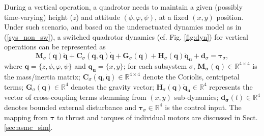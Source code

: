 During a vertical operation, a quadrotor needs to maintain a given (possibly time-varying) height ($z$) and attitude $(\phi, \varphi, \psi)$, at a fixed $(x,y)$ position. Under such scenario, and based on the underactuated dynamics model as in (\ref{sys_non_sw}), a switched quadrotor dynamics (cf. Fig. \ref{fig:dyn}) for vertical operations can be represented as 
\begin{equation}\label{sys_1}
\mathbf M_{\sigma}( \mathbf q)\ddot{ \mathbf q}+\mathbf C_{\sigma}(\mathbf q,\dot{\mathbf q})\dot{\mathbf q}+\mathbf G_{\sigma}(\mathbf q)+\mathbf{H}_\sigma( \mathbf q)\ddot{ \mathbf{q}}_{\mathbf u}+\mathbf{ d}_{\sigma}=\boldsymbol \tau_{\sigma},
\end{equation} 
where $\mathbf{q}=\lbrace z, \phi, \varphi, \psi \rbrace$ and $\mathbf{q_u}=\lbrace x,y \rbrace$; for each subsystem $\sigma$, $\mathbf{M_{\sigma}(q)}\in\mathbb{R}^{4\times 4}$ is the mass/inertia matrix; $\mathbf C_{\sigma}(\mathbf q,\dot{\mathbf q})\in\mathbb{R}^{4 \times 4}$ denote the Coriolis, centripetal terms; $\mathbf G_{\sigma}(\mathbf q)\in\mathbb{R}^{4}$ denotes the gravity vector; $\mathbf{H}_\sigma( \mathbf q)\ddot{ \mathbf{q}}_{\mathbf u}\in\mathbb{R}^{4}$ represents the vector of cross-coupling terms stemming from $(x,y)$ sub-dynamics; $\mathbf{ d_{\sigma}}(t) \in \mathbb{R}^4$ denotes bounded external disturbance and $\boldsymbol \tau_{\sigma} \in \mathbb{R}^4$ is the control input. The mapping from $\mathbf \tau$ to thrust and torques of individual motors are discussed in Sect. \ref{sec:asmc_sim}. %

